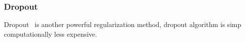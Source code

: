 \subsubsection{Dropout}

Dropout~\cite{JMLR:v15:srivastava14a} is another powerful regularization method, dropout algorithm is simp  computationally less expensive. 
